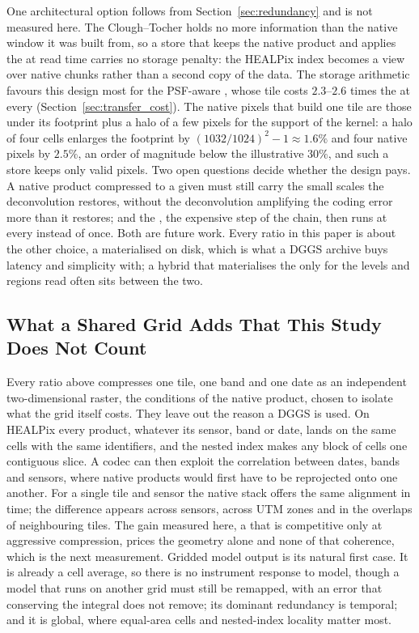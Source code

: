 One architectural option follows from Section~\ref{sec:redundancy} and is
not measured here. The Clough--Tocher  holds no more information
than the native window it was built from, so a store that keeps the
native product and applies the  at read time carries no
storage penalty: the HEALPix index becomes a view over native chunks
rather than a second copy of the data. The storage arithmetic favours
this design most for the PSF-aware , whose tile costs
$2.3$--$2.6$ times the  at every 
(Section~\ref{sec:transfer_cost}). The native pixels that build one
tile are those under its footprint plus a halo of a few pixels for the
support of the kernel: a halo of four cells enlarges the footprint by
$(1032/1024)^2-1\approx1.6\%$ and four native pixels by $2.5\%$, an
order of magnitude below the illustrative $30\%$, and such a store
keeps only valid pixels. Two open questions decide whether the design
pays. A native product compressed to a given  must still
carry the small scales the deconvolution restores, without the
deconvolution amplifying the coding error more than it restores; and
the , the expensive step of the chain, then runs at every
 instead of once. Both are future work. Every ratio in this
paper is about the other choice, a  materialised on disk,
which is what a DGGS archive buys latency and simplicity with; a hybrid
that materialises the  only for the levels and regions
read often sits between the two.

\subsection{What a Shared Grid Adds That This Study Does Not Count}
\label{sec:shared_grid}
Every ratio above compresses one tile, one band and one date as an
independent two-dimensional raster, the conditions of the native
product, chosen to isolate what the grid itself costs. They leave out
the reason a DGGS is used. On HEALPix every product, whatever its
sensor, band or date, lands on the same cells with the same
identifiers, and the nested index makes any block of cells one
contiguous slice. A codec can then exploit the correlation between
dates, bands and sensors, where native products would first have to be
reprojected onto one another. For a single tile and sensor the native
stack offers the same alignment in time; the difference appears across
sensors, across UTM zones and in the overlaps of neighbouring tiles. The
gain measured here, a  that is competitive only at
aggressive compression, prices the geometry alone and none of that
coherence, which is the next measurement. Gridded model output is its
natural first case. It is already a cell average, so there is no
instrument response to model, though a model that runs on another grid
must still be remapped, with an error that conserving the integral
does not remove; its dominant redundancy is temporal; and it is global,
where equal-area cells and nested-index locality matter most.

